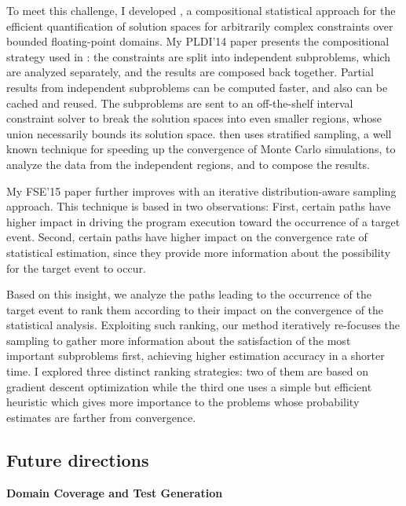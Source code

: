 \documentclass[12pt]{article}
\begin{document}
To meet this challenge, I developed
\qCORAL\cite{borges2014compositional}, a compositional statistical
approach for the efficient quantification of solution spaces for
arbitrarily complex constraints over bounded floating-point
domains. My PLDI'14 paper presents the compositional strategy used in
\qCORAL: the constraints are split into independent subproblems, which
are analyzed separately, and the results are composed back
together. Partial results from independent subproblems can be computed
faster, and also can be cached and reused. The subproblems are sent to
an off-the-shelf interval constraint solver to break the solution
spaces into even smaller regions, whose union necessarily bounds its
solution space.  \qCORAL then uses stratified sampling, a well known
technique for speeding up the convergence of Monte Carlo simulations,
to analyze the data from the independent regions, and to compose the
results.

My FSE'15 paper \cite{borges2015iterative} further improves \qCORAL
with an iterative distribution-aware sampling approach. This technique
is based in two observations: First, certain paths have higher impact
in driving the program execution toward the occurrence of a target
event. Second, certain paths have higher impact on the convergence
rate of statistical estimation, since they provide more information
about the possibility for the target event to occur.

Based on this insight, we analyze the paths leading to the occurrence
of the target event to rank them according to their impact on the
convergence of the statistical analysis.  Exploiting such ranking, our
method iteratively re-focuses the sampling to gather more information
about the satisfaction of the most important subproblems first,
achieving higher estimation accuracy in a shorter time. I explored
three distinct ranking strategies: two of them are based on gradient
descent optimization while the third one uses a simple but efficient
heuristic which gives more importance to the problems whose
probability estimates are farther from convergence.


\subsection*{Future directions}

\noindent \textbf{Domain Coverage and Test Generation} 
\end{document}
